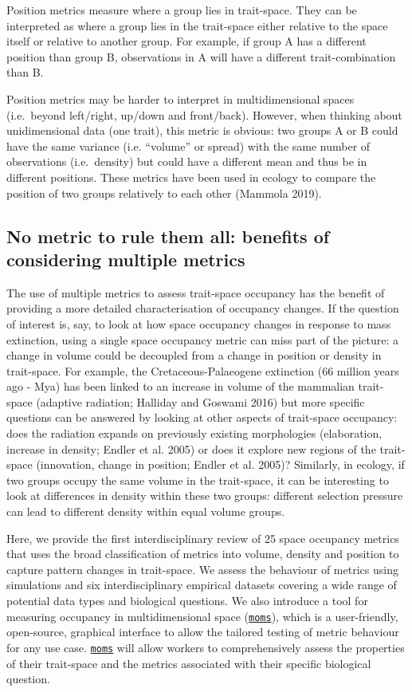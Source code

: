 \documentclass[]{article}
\begin{document}
Position metrics measure where a group lies in trait-space. They can be
interpreted as where a group lies in the trait-space either relative to
the space itself or relative to another group. For example, if group A
has a different position than group B, observations in A will have a
different trait-combination than B.

Position metrics may be harder to interpret in multidimensional spaces
(i.e.~beyond left/right, up/down and front/back). However, when thinking
about unidimensional data (one trait), this metric is obvious: two
groups A or B could have the same variance (i.e. ``volume'' or spread)
with the same number of observations (i.e.~density) but could have a
different mean and thus be in different positions. These metrics have
been used in ecology to compare the position of two groups relatively to
each other (Mammola 2019).

\subsection{No metric to rule them all: benefits of considering multiple
metrics}\label{no-metric-to-rule-them-all-benefits-of-considering-multiple-metrics}

The use of multiple metrics to assess trait-space occupancy has the
benefit of providing a more detailed characterisation of occupancy
changes. If the question of interest is, say, to look at how space
occupancy changes in response to mass extinction, using a single space
occupancy metric can miss part of the picture: a change in volume could
be decoupled from a change in position or density in trait-space. For
example, the Cretaceous-Palaeogene extinction (66 million years ago -
Mya) has been linked to an increase in volume of the mammalian
trait-space (adaptive radiation; Halliday and Goswami 2016) but more
specific questions can be answered by looking at other aspects of
trait-space occupancy: does the radiation expands on previously existing
morphologies (elaboration, increase in density; Endler et al. 2005) or
does it explore new regions of the trait-space (innovation, change in
position; Endler et al. 2005)? Similarly, in ecology, if two groups
occupy the same volume in the trait-space, it can be interesting to look
at differences in density within these two groups: different selection
pressure can lead to different density within equal volume groups.

Here, we provide the first interdisciplinary review of 25 space
occupancy metrics that uses the broad classification of metrics into
volume, density and position to capture pattern changes in trait-space.
We assess the behaviour of metrics using simulations and six
interdisciplinary empirical datasets covering a wide range of potential
data types and biological questions. We also introduce a tool for
measuring occupancy in multidimensional space
(\href{https://tguillerme.shinyapps.io/moms/}{\texttt{moms}}), which is
a user-friendly, open-source, graphical interface to allow the tailored
testing of metric behaviour for any use case.
\href{https://tguillerme.shinyapps.io/moms/}{\texttt{moms}} will allow
workers to comprehensively assess the properties of their trait-space
and the metrics associated with their specific biological question.
\end{document}
